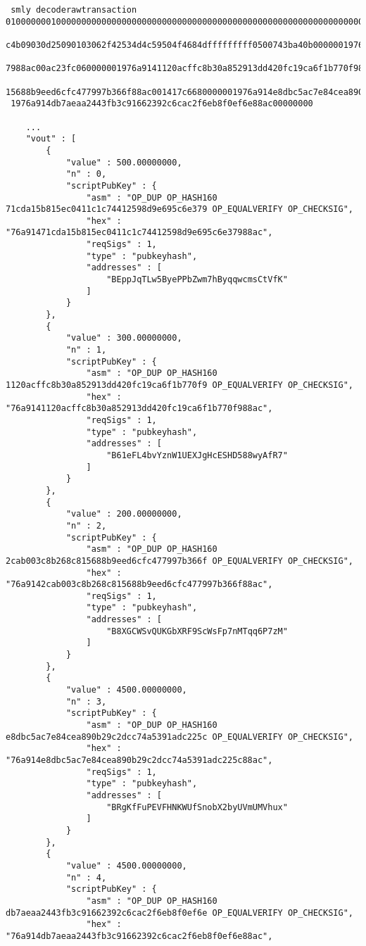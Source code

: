 \begin{verbatim}
 smly decoderawtransaction 01000000010000000000000000000000000000000000000000000000000000000000000000ffffffff16032
 c4b09030d25090103062f42534d4c59504f4684dfffffffff0500743ba40b0000001976a91471cda15b815ec0411c1c74412598d9e695c6e3
 7988ac00ac23fc060000001976a9141120acffc8b30a852913dd420fc19ca6f1b770f988ac00c817a8040000001976a9142cab003c8b268c8
 15688b9eed6cfc477997b366f88ac001417c6680000001976a914e8dbc5ac7e84cea890b29c2dcc74a5391adc225c88ac001417c668000000
 1976a914db7aeaa2443fb3c91662392c6cac2f6eb8f0ef6e88ac00000000

    ...
    "vout" : [
        {
            "value" : 500.00000000,
            "n" : 0,
            "scriptPubKey" : {
                "asm" : "OP_DUP OP_HASH160 71cda15b815ec0411c1c74412598d9e695c6e379 OP_EQUALVERIFY OP_CHECKSIG",
                "hex" : "76a91471cda15b815ec0411c1c74412598d9e695c6e37988ac",
                "reqSigs" : 1,
                "type" : "pubkeyhash",
                "addresses" : [
                    "BEppJqTLw5ByePPbZwm7hByqqwcmsCtVfK"
                ]
            }
        },
        {
            "value" : 300.00000000,
            "n" : 1,
            "scriptPubKey" : {
                "asm" : "OP_DUP OP_HASH160 1120acffc8b30a852913dd420fc19ca6f1b770f9 OP_EQUALVERIFY OP_CHECKSIG",
                "hex" : "76a9141120acffc8b30a852913dd420fc19ca6f1b770f988ac",
                "reqSigs" : 1,
                "type" : "pubkeyhash",
                "addresses" : [
                    "B61eFL4bvYznW1UEXJgHcESHD588wyAfR7"
                ]
            }
        },
        {
            "value" : 200.00000000,
            "n" : 2,
            "scriptPubKey" : {
                "asm" : "OP_DUP OP_HASH160 2cab003c8b268c815688b9eed6cfc477997b366f OP_EQUALVERIFY OP_CHECKSIG",
                "hex" : "76a9142cab003c8b268c815688b9eed6cfc477997b366f88ac",
                "reqSigs" : 1,
                "type" : "pubkeyhash",
                "addresses" : [
                    "B8XGCWSvQUKGbXRF9ScWsFp7nMTqq6P7zM"
                ]
            }
        },
        {
            "value" : 4500.00000000,
            "n" : 3,
            "scriptPubKey" : {
                "asm" : "OP_DUP OP_HASH160 e8dbc5ac7e84cea890b29c2dcc74a5391adc225c OP_EQUALVERIFY OP_CHECKSIG",
                "hex" : "76a914e8dbc5ac7e84cea890b29c2dcc74a5391adc225c88ac",
                "reqSigs" : 1,
                "type" : "pubkeyhash",
                "addresses" : [
                    "BRgKfFuPEVFHNKWUfSnobX2byUVmUMVhux"
                ]
            }
        },
        {
            "value" : 4500.00000000,
            "n" : 4,
            "scriptPubKey" : {
                "asm" : "OP_DUP OP_HASH160 db7aeaa2443fb3c91662392c6cac2f6eb8f0ef6e OP_EQUALVERIFY OP_CHECKSIG",
                "hex" : "76a914db7aeaa2443fb3c91662392c6cac2f6eb8f0ef6e88ac",
\end{verbatim}

